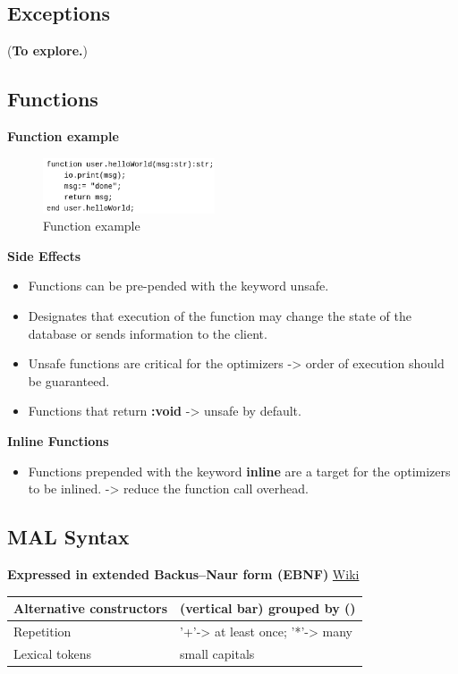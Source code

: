 \documentclass[11pt]{article}
\begin{document}
\subsection{Exceptions}
\label{sec:org770eebf}
(\textbf{To explore.})

\subsection{Functions}
\label{sec:orgf2bcbe8}

\textbf{Function example}
\begin{figure}[htbp]
\centering
\includegraphics[width=2.0in]{./Pictures/fun-ex.png}
\caption{\label{fig:orgdb1eeef}
Function example}
\end{figure}

\textbf{Side Effects}
\begin{itemize}
\item Functions can be pre-pended with the keyword unsafe.
\item Designates that execution of the function may change the state of the database or sends information to the client.
\item Unsafe functions are critical for the optimizers -> order of execution should be guaranteed.
\item Functions that return \textbf{:void} -> unsafe by default.
\end{itemize}

\textbf{Inline Functions}
\begin{itemize}
\item Functions prepended with the keyword \textbf{inline} are a target for the optimizers to be inlined. -> reduce the function call overhead.
\end{itemize}

\subsection{MAL Syntax}
\label{sec:org002a47c}

\textbf{Expressed in extended Backus–Naur form (EBNF)} \href{https://en.wikipedia.org/wiki/Extended\_Backus\%E2\%80\%93Naur\_form}{Wiki}

\begin{center}
\begin{tabular}{ll}
\hline
Alternative constructors & (vertical bar) grouped by ()\\
\hline
Repetition & '+'-> at least once; '*'-> many\\
\hline
Lexical tokens & small capitals\\
\hline
\end{tabular}
\end{center}
\end{document}
